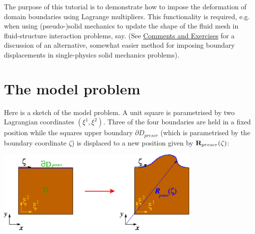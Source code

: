 The purpose of this tutorial is to demonstrate how to impose the deformation of domain boundaries using Lagrange multipliers. This functionality is required, e.\+g. when using (pseudo-\/)solid mechanics to update the shape of the fluid mesh in fluid-\/structure interaction problems, say. (See \hyperlink{index_comm_and_ex}{Comments and Exercises} for a discussion of an alternative, somewhat easier method for imposing boundary displacements in single-\/physics solid mechanics problems).



 

\hypertarget{index_model}{}\section{The model problem}\label{index_model}
Here is a sketch of the model problem. A unit square is parametrised by two Lagrangian coordinates $ (\xi^1,\xi^2) $. Three of the four boundaries are held in a fixed position while the square\textquotesingle{}s upper boundary $ \partial D_{prescr}$ (which is parametrised by the boundary coordinate $ \zeta$) is displaced to a new position given by $ {\bf R}_{prescr}(\zeta) $\+:

 
\begin{DoxyImage}
\includegraphics[width=0.75\textwidth]{sketch}
\end{DoxyImage}




 

